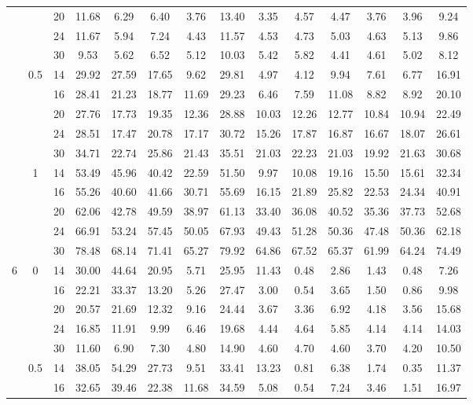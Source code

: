 \documentclass[num-refs]{wiley-article}
\begin{document}
\begin{table}
\begin{tabular}[t]{cccccccccccccc}
& & 20 & 11.68 & 6.29 & 6.40 & 3.76 & 13.40 & 3.35 & 4.57 & 4.47 & 3.76 & 3.96 & 9.24\\
& & 24 & 11.67 & 5.94 & 7.24 & 4.43 & 11.57 & 4.53 & 4.73 & 5.03 & 4.63 & 5.13 & 9.86\\
& & 30 & 9.53 & 5.62 & 6.52 & 5.12 & 10.03 & 5.42 & 5.82 & 4.41 & 4.61 & 5.02 & 8.12\\
\hline
 & 0.5 & 14 & 29.92 & 27.59 & 17.65 & 9.62 & 29.81 & 4.97 & 4.12 & 9.94 & 7.61 & 6.77 & 16.91\\
& & 16 & 28.41 & 21.23 & 18.77 & 11.69 & 29.23 & 6.46 & 7.59 & 11.08 & 8.82 & 8.92 & 20.10\\
& & 20 & 27.76 & 17.73 & 19.35 & 12.36 & 28.88 & 10.03 & 12.26 & 12.77 & 10.84 & 10.94 & 22.49\\
& & 24 & 28.51 & 17.47 & 20.78 & 17.17 & 30.72 & 15.26 & 17.87 & 16.87 & 16.67 & 18.07 & 26.61\\
& & 30 & 34.71 & 22.74 & 25.86 & 21.43 & 35.51 & 21.03 & 22.23 & 21.03 & 19.92 & 21.63 & 30.68\\
\hline
& 1& 14 & 53.49 & 45.96 & 40.42 & 22.59 & 51.50 & 9.97 & 10.08 & 19.16 & 15.50 & 15.61 & 32.34\\
& & 16 & 55.26 & 40.60 & 41.66 & 30.71 & 55.69 & 16.15 & 21.89 & 25.82 & 22.53 & 24.34 & 40.91\\
& & 20 & 62.06 & 42.78 & 49.59 & 38.97 & 61.13 & 33.40 & 36.08 & 40.52 & 35.36 & 37.73 & 52.68\\
& & 24 & 66.91 & 53.24 & 57.45 & 50.05 & 67.93 & 49.43 & 51.28 & 50.36 & 47.48 & 50.36 & 62.18\\
&& 30 & 78.48 & 68.14 & 71.41 & 65.27 & 79.92 & 64.86 & 67.52 & 65.37 & 61.99 & 64.24 & 74.49\\
\hline
6 & 0 & 14 & 30.00 & 44.64 & 20.95 & 5.71 & 25.95 & 11.43 & 0.48 & 2.86 & 1.43 & 0.48 & 7.26\\
& & 16 & 22.21 & 33.37 & 13.20 & 5.26 & 27.47 & 3.00 & 0.54 & 3.65 & 1.50 & 0.86 & 9.98\\
& & 20 & 20.57 & 21.69 & 12.32 & 9.16 & 24.44 & 3.67 & 3.36 & 6.92 & 4.18 & 3.56 & 15.68\\
& & 24 & 16.85 & 11.91 & 9.99 & 6.46 & 19.68 & 4.44 & 4.64 & 5.85 & 4.14 & 4.14 & 14.03\\
& & 30 & 11.60 & 6.90 & 7.30 & 4.80 & 14.90 & 4.60 & 4.70 & 4.60 & 3.70 & 4.20 & 10.50\\
\hline
 & 0.5 & 14 & 38.05 & 54.29 & 27.73 & 9.51 & 33.41 & 13.23 & 0.81 & 6.38 & 1.74 & 0.35 & 11.37\\
& & 16 & 32.65 & 39.46 & 22.38 & 11.68 & 34.59 & 5.08 & 0.54 & 7.24 & 3.46 & 1.51 & 16.97\\

\end{tabular}
\end{table}
\end{document}
